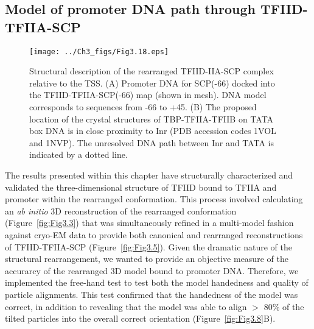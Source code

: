 \subsection{Model of promoter DNA path through TFIID-TFIIA-SCP}
\begin{figure}
\centering
\texttt{[image: ../Ch3\_figs/Fig3.18.eps]}
\caption[Structural description of the rearranged TFIID-IIA-SCP complex relative to the TSS]{Structural description of the rearranged TFIID-IIA-SCP complex relative to the TSS. (A) Promoter DNA for SCP(-66) docked into the TFIID-TFIIA-SCP(-66) map (shown in mesh). DNA model corresponds to sequences from -66 to +45. (B) The proposed location of the crystal structures of TBP-TFIIA-TFIIB on TATA box DNA is in close proximity to Inr (PDB accession codes 1VOL and 1NVP). The unresolved DNA path between Inr and TATA is indicated by a dotted line.}
\label{fig:Fig3.18}
\end{figure}
The results presented within this chapter have structurally characterized and validated the three-dimensional structure of TFIID bound to TFIIA and promoter within the rearranged conformation. This process involved calculating an \emph{ab initio} 3D reconstruction of the rearranged conformation (Figure~\ref{fig:Fig3.3}) that was simultaneously refined in a multi-model fashion against cryo-EM data to provide both canonical and rearranged reconstructions of TFIID-TFIIA-SCP (Figure~\ref{fig:Fig3.5}). Given the dramatic nature of the structural rearrangement, we wanted to provide an objective measure of the accurarcy of the rearranged 3D model bound to promoter DNA. Therefore, we implemented the free-hand test to test both the model handedness and quality of particle alignments. This test confirmed that the handedness of the model was correct, in addition to revealing that the model was able to align $>$ 80\% of the tilted particles into the overall correct orientation (Figure~\ref{fig:Fig3.8}B).  \\
